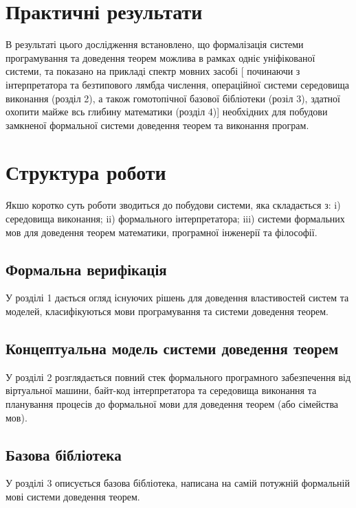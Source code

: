 \section*{Практичні результати}

В результаті цього дослідження встановлено, що формалізація системи
програмування та доведення теорем можлива в рамках одніє уніфікованої
системи, та показано на прикладі спектр мовних засобі [ починаючи з інтерпретатора
та безтипового лямбда числення, операційної системи середовища виконання (розділ 2),
а також гомотопічної базової бібліотеки (розіл 3), здатної охопити майже всь
глибину математики (розділ 4)] необхідних для побудови замкненої формальної системи
доведення теорем та виконання програм.

\section*{Структура роботи}

Якшо коротко суть роботи зводиться до побудови системи, яка складається з:
i) середовища виконання; ii) формального інтерпретатора; iii) системи формальних мов
для доведення теорем математики, програмної інженерії та філософії.

\subsection*{Формальна верифікація}

У розділі 1 дається огляд існуючих рішень для доведення
властивостей систем та моделей, класифікуються мови програмування
та системи доведення теорем.

\subsection*{Концептуальна модель системи доведення теорем}

У розділі 2 розглядається повний стек формального програмного забезпечення
від віртуальної машини, байт-код інтерпретатора та середовища виконання
та планування процесів до формальної мови для доведення теорем (або сімейства мов).

\subsection*{Базова бібліотека}

У розділі 3 описується базова бібліотека, написана на самій потужній
формальній мові системи доведення теорем.

